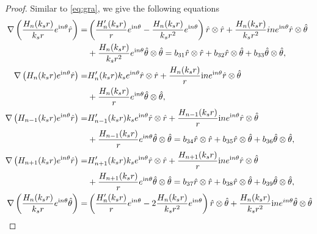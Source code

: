 \documentclass[11pt,reqno,twoside]{amsart}
\theoremstyle{definition}
\theoremstyle{remark}
\numberwithin{equation}{section}
\begin{document}
\begin{proof}
				\iffalse
				Similar to \eqref{eq:gra}, we give the following equations
				\begin{align}\label{eq:grad}
					\nabla \left ( \frac{H_{n} (k_{s}  r )}{k_{s}r} e^{\mathrm{i}n\theta } \hat{r}  \right )=&\left( \frac{H_{n}' (k_{s} r )}{r} e^{\mathrm{i}n\theta } -\frac{H_{n} (k_{s} r )}{k_{s}r^2} e^{\mathrm{i}n\theta }\right)\hat{r}\otimes\hat{r}+\frac{H_{n} (k_{s} r )}{k_{s}r^2}in e^{\mathrm{i}n\theta }\hat{r}\otimes\hat{\theta }\\
					&+\frac{H_{n} (k_{s}r )}{k_{s}r^2}e^{\mathrm{i}n\theta }\hat{\theta }\otimes\hat{\theta }= b_{31}\hat{r}\otimes\hat{r}+b_{32}\hat{r}\otimes\hat{\theta }+b_{33}\hat{\theta }\otimes\hat{\theta },\notag\\
					\nabla \left ( H_{n} (k_{s} r ) e^{\mathrm{i}n\theta } \hat{r}  \right )\notag=& H_{n}' (k_{s}r) k_{s}e^{\mathrm{i}n\theta } \hat{r}\otimes\hat{r}+\frac{H_{n} ( k_{s} r )}{r}\mathrm{i}n e^{\mathrm{i}n\theta }\hat{r}\otimes\hat{\theta }\notag\\
					&+\frac{H_{n} ( k_{s} r )}{r}e^{\mathrm{i}n\theta }\hat{\theta }\otimes\hat{\theta },\notag\\
					\nabla \left ( H_{n-1} (k_{s} r ) e^{\mathrm{i}n\theta } \hat{r}  \right )=& H_{n-1}' (k_{s} r) k_{s}e^{\mathrm{i}n\theta } \hat{r}\otimes\hat{r}+\frac{H_{n-1} ( k_{s} r )}{r}\mathrm{i}n e^{\mathrm{i}n\theta }\hat{r}\otimes\hat{\theta }\notag\\
					&+\frac{H_{n-1} ( k_{s} r )}{r}e^{\mathrm{i}n\theta }\hat{\theta }\otimes\hat{\theta }=b_{34}\hat{r}\otimes\hat{r}+b_{35}\hat{r}\otimes\hat{\theta }+b_{36}\hat{\theta }\otimes\hat{\theta },\notag\\
					\nabla \left ( H_{n+1} (k_{s}r ) e^{\mathrm{i}n\theta } \hat{r}  \right )=& H_{n+1}' (k_{s}r) k_{s}e^{\mathrm{i}n\theta } \hat{r}\otimes\hat{r}+\frac{H_{n+1} ( k_{s} r )}{r}\mathrm{i}n e^{\mathrm{i}n\theta }\hat{r}\otimes\hat{\theta }\notag\\
					&+\frac{H_{n+1} ( k_{s} r )}{r}e^{\mathrm{i}n\theta }\hat{\theta }\otimes\hat{\theta }=b_{37}\hat{r}\otimes\hat{r}+b_{38}\hat{r}\otimes\hat{\theta }+b_{39}\hat{\theta }\otimes\hat{\theta },\notag\\
					\nabla \left ( \frac{H_{n} (k_{s} r )}{k_{s}r} e^{\mathrm{i}n\theta } \hat{\theta}  \right )=&\left( \frac{H_{n}' (k_{s} r )}{r} e^{\mathrm{i}n\theta } -2\frac{H_{n} (k_{s} r )}{k_{s}r^2} e^{\mathrm{i}n\theta }\right)\hat{r}\otimes\hat{\theta }+\frac{H_{n} (k_{s} r )}{k_{s}r^2}\mathrm{i}ne^{in\theta }\hat{\theta }\otimes\hat{\theta }\notag\\

\end{align}
\end{proof}
\end{document}
